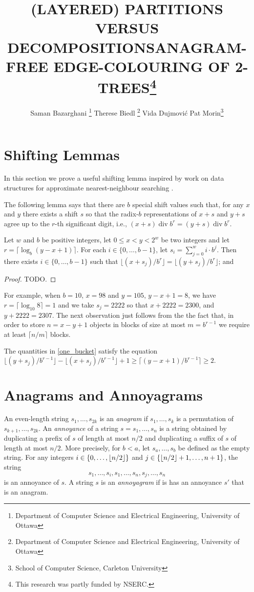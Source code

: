 \documentclass[kpfonts]{patmorin}
\title{\MakeUppercase{(Layered) Partitions versus Decompositions}}
\author{}
\title{\MakeUppercase{Anagram-Free Edge-Colouring of 2-Trees}\thanks{This research was partly funded by NSERC.}}
\author{Saman Bazarghani%
    \thanks{Department of Computer Science and Electrical Engineering, University of Ottawa}\qquad
    Therese Biedl%
    \thanks{Department of Computer Science and Electrical Engineering, University of Ottawa}\qquad
    Vida Dujmović\footnotemark[2]\qquad
    Pat Morin\footnotemark[3]%
    \thanks{School of Computer Science, Carleton University}}
\DeclareMathOperator{\ddiv}{div}
\begin{document}
\maketitle

\section{Shifting Lemmas}

In this section we prove a useful shifting lemma inspired by work on data structures for approximate nearest-neighbour searching \cite{chan:closest-point}.

The following lemma says that there are $b$ special shift values such that, for any $x$ and $y$ there exists a shift $s$ so that the radix-$b$ representations of $x+s$ and $y+s$ agree up to the $r$-th significant digit, i.e., $(x+s)\ddiv b^r=(y+s)\ddiv b^r$.

\begin{clm}\label{one_bucket}
    Let $w$ and $b$ be positive integers, let $0\le x < y < 2^w$ be two integers and let $r=\lceil\log_{b}(y-x+1)\rceil$.  For each $i\in\{0,\ldots,b-1\}$, let $s_i=\sum_{j=0}^w i\cdot b^j$. Then there exists $i\in\{0,\ldots,b-1\}$ such that
   $\lfloor (x+s_j)/b^r\rfloor = \lfloor (y+s_j)/b^r\rfloor$; and
\end{clm}

\begin{proof}
    TODO.
\end{proof}

For example, when $b=10$, $x=98$ and $y=105$, $y-x+1=8$, we have $r=\lceil\log_{10} 8\rceil=1$ and we take $s_j=2222$ so that $x+2222 = 2300$, and $y+2222=2307$.  The next observation just follows from the the fact that, in order to store $n=x-y+1$ objects in blocks of size at most $m=b^{r-1}$ we require at least $\lceil n/m\rceil$ blocks.

\begin{obs}\label{big_gap}
    The quantities in \cref{one_bucket} satisfy the equation $\lfloor(y+s_j)/b^{r-1}\rfloor-\lfloor(x+s_j)/b^{r-1}\rfloor+1\ge\lceil(y-x+1)/b^{r-1}\rceil\ge 2$.
\end{obs}


\section{Anagrams and Annoyagrams}

An even-length string $s_1,\ldots,s_{2k}$ is an \emph{anagram} if $s_1,\ldots,s_k$ is a permutation of $s_{k+1},\ldots,s_{2k}$.  An \emph{annoyance} of a string $s=s_1,\ldots,s_n$ is a string obtained by duplicating a prefix of $s$ of length at most $n/2$ and duplicating a suffix of $s$ of length at most $n/2$.  More precisely, for $b <a$, let $s_a,\ldots,s_b$ be defined as the empty string.  For any integers $i\in\{0,\ldots,{\lfloor n/2 \rfloor}\}$ and $j\in\{{\lfloor n/2 \rfloor}+1,\ldots,n+1\}$, the string
\[
    s_1,\ldots,s_{i}, s_1,\ldots,s_n,s_{j},\ldots,s_n
\]
is an annoyance of $s$. A string $s$ is an \emph{annoyagram} if is has an annoyance $s'$ that is an anagram.
\end{document}
